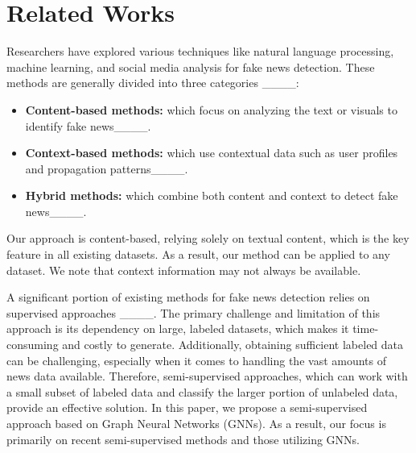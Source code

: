 \section{Related Works}
\label{sec:rw}
Researchers have explored various techniques like natural language processing, machine learning, and social media analysis for fake news detection. 
These methods are generally divided into three categories ____:
\begin{itemize}
	\item \textbf{Content-based methods:}
	which focus on analyzing the text or visuals to identify fake news____.
	\item \textbf{Context-based methods:}
	which use contextual data such as user profiles and propagation patterns____.
	\item \textbf{Hybrid methods:}
	which combine both content and context to detect fake news____.
\end{itemize}
Our approach is content-based, relying solely on textual content, which is the key feature in all existing datasets. As a result, our method can be applied to any dataset.
We note that context information may not always be available.

A significant portion of existing methods for fake news detection relies on supervised approaches ____.
The primary challenge and limitation of this approach is its dependency on large, labeled datasets, which makes it time-consuming and costly to generate. 
Additionally, obtaining sufficient labeled data can be challenging, especially when it comes to handling the vast amounts of news data available.  
Therefore, semi-supervised approaches, which can work with a small subset of labeled data and classify the larger portion of unlabeled data, provide an effective solution. 
In this paper, we propose a semi-supervised approach based on Graph Neural Networks (GNNs). 
As a result, our focus is primarily on recent semi-supervised methods and those utilizing GNNs.

